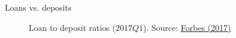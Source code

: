 \begin{frame}{Loans vs. deposits}

\begin{figure}
\begin{center}


\caption{\label{fig:L4_2017_loan_to_dep_ratio} Loan to deposit ratios ($2017Q1$). Source: \href{https://www.forbes.com/sites/greatspeculations/2017/06/13/loan-to-deposit-ratios-for-largest-u-s-banks-show-signs-of-recovery-in-q1/\#5d0aa40b12f4}{Forbes (2017)}}

\end{center}
\end{figure}




\end{frame}
